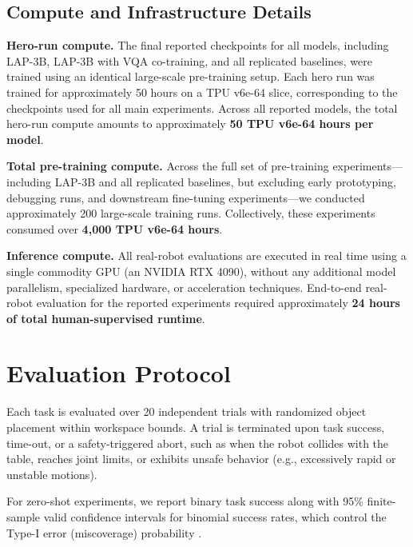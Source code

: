 \subsection{Compute and Infrastructure Details}
\label{app:compute}

\noindent\textbf{Hero-run compute.}
The final reported checkpoints for all models, including \textsc{LAP-3B}, \textsc{LAP-3B} with VQA co-training, and all replicated baselines, were trained using an identical large-scale pre-training setup. Each hero run was trained for approximately 50 hours on a TPU v6e-64 slice, corresponding to the checkpoints used for all main experiments. Across all reported models, the total hero-run compute amounts to approximately \textbf{50 TPU v6e-64 hours per model}.

\medskip
\noindent\textbf{Total pre-training compute.}
Across the full set of pre-training experiments—including \textsc{LAP-3B} and all replicated baselines, but excluding early prototyping, debugging runs, and downstream fine-tuning experiments—we conducted approximately 200 large-scale training runs. Collectively, these experiments consumed over \textbf{4,000 TPU v6e-64 hours}.

\medskip
\noindent\textbf{Inference compute.}
All real-robot evaluations are executed in real time using a single commodity GPU (an NVIDIA RTX 4090), without any additional model parallelism, specialized hardware, or acceleration techniques. End-to-end real-robot evaluation for the reported experiments required approximately \textbf{24 hours of total human-supervised runtime}.



\section{Evaluation Protocol}
\label{app:evaluation_details}

Each task is evaluated over 20 independent trials with randomized object placement within workspace bounds. A trial is terminated upon task success, time-out, or a safety-triggered abort, such as when the robot collides with the table, reaches joint limits, or exhibits unsafe behavior (e.g., excessively rapid or unstable motions).

For zero-shot experiments, we report binary task success along with 95\% finite-sample valid confidence intervals for binomial success rates, which control the Type-I error (miscoverage) probability \cite{vincent2024generalizablebehaviorcloningpolicy}.

